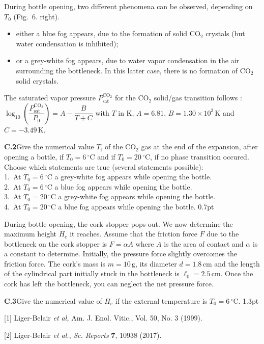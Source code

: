 During bottle opening, two different phenomena can be observed, depending on
$T_0$ (Fig.~6. right).
\begin{itemize}
\item either a blue fog appears, due to the formation of solid $\mathrm{CO_2}$
crystals (but water condensation is inhibited);
\item or a grey-white fog appears, due to water vapor condensation in the air
surrounding the bottleneck. In this latter case, there is no formation of
$\mathrm{CO_2}$ solid crystals.
\end{itemize}

The saturated vapor pressure $P_\mathrm{sat}^{\mathrm{CO_2}}$ for the
$\mathrm{CO_2}$ solid/gas transition follows :
$\log_{10}\left(\dfrac{P_\mathrm{sat}^{\mathrm{CO_2}}}{P_0}\right) = A -
\dfrac{B}{T + C}$ with $T$ in $\mathrm{K}$, $A = 6.81$,
$B = 1.30 \times 10^3\,\mathrm{K}$ and $C = -3.49\,\mathrm{K}$.

\textbf{C.2}\quad Give the numerical value $T_\mathrm{f}$ of the
$\mathrm{CO_2}$ gas at the end of the expansion, after opening a bottle, if
$T_0 = 6\,^\circ\mathrm{C}$ and if $T_0 = 20\,^\circ\mathrm{C}$, if no phase
transition occured. Choose which statements are true (several statements
possible):\\
\hspace*{1.5em}1.\ At $T_0 = 6\,^\circ\mathrm{C}$ a grey-white fog appears
while opening the bottle.\\
\hspace*{1.5em}2.\ At $T_0 = 6\,^\circ\mathrm{C}$ a blue fog appears while
opening the bottle.\\
\hspace*{1.5em}3.\ At $T_0 = 20\,^\circ\mathrm{C}$ a grey-white fog appears
while opening the bottle.\\
\hspace*{1.5em}4.\ At $T_0 = 20\,^\circ\mathrm{C}$ a blue fog appears while
opening the bottle. \hfill 0.7pt

During bottle opening, the cork stopper pops out. We now determine the maximum
height $H_\mathrm{c}$ it reaches. Assume that the friction force $F$ due to the
bottleneck on the cork stopper is $F = \alpha A$ where $A$ is the area of
contact and $\alpha$ is a constant to determine. Initially, the pressure force
slightly overcomes the friction force. The cork's mass is
$m = 10\,\mathrm{g}$, its diameter $d = 1.8\,\mathrm{cm}$ and the length of
the cylindrical part initially stuck in the bottleneck is
$\ell_0 = 2.5\,\mathrm{cm}$. Once the cork has left the bottleneck, you can
neglect the net pressure force.

\textbf{C.3}\quad Give the numerical value of $H_\mathrm{c}$ if the external
temperature is $T_0 = 6\,^\circ\mathrm{C}$. \hfill 1.3pt

[1] Liger-Belair \textit{et al,} Am. J. Enol. Vitic., Vol. 50, No. 3 (1999).

[2] Liger-Belair \textit{et al.}, \textit{Sc. Reports} \textbf{7}, 10938
(2017).
